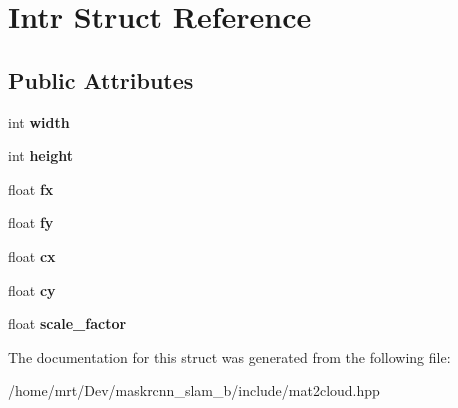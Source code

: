 \hypertarget{structIntr}{}\section{Intr Struct Reference}
\label{structIntr}
\subsection*{Public Attributes}
\begin{DoxyCompactItemize}
\item 
\mbox{\label{structIntr_a5198031fc3d7e82743bffa8d59f22edd}} 
int {\bfseries width}
\item 
\mbox{\label{structIntr_a4c0259eeeae9f2c0c7448ca252f85a9d}} 
int {\bfseries height}
\item 
\mbox{\label{structIntr_aa3071d7757226bfafdc9ea8f6250876f}} 
float {\bfseries fx}
\item 
\mbox{\label{structIntr_a9cc208a66788d22b9339dfb67cf3a508}} 
float {\bfseries fy}
\item 
\mbox{\label{structIntr_a010bbec7d3461ba3148e3cec7306cc51}} 
float {\bfseries cx}
\item 
\mbox{\label{structIntr_a2898cacb5ff3996bf2fc0527888db095}} 
float {\bfseries cy}
\item 
\mbox{\label{structIntr_a7fa71a3de182c0656bb7407091ca33f7}} 
float {\bfseries scale\+\_\+factor}
\end{DoxyCompactItemize}


The documentation for this struct was generated from the following file\+:\begin{DoxyCompactItemize}
\item 
/home/mrt/\+Dev/maskrcnn\+\_\+slam\+\_\+b/include/mat2cloud.\+hpp\end{DoxyCompactItemize}
